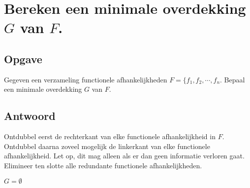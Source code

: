 \documentclass[normaalvormen.tex]{subfiles}
\begin{document}
\section{Bereken een minimale overdekking $G$ van $F$.}
\subsection{Opgave}
Gegeven een verzameling functionele afhankelijkheden $F= \{f_1,f_2,\cdots,f_n$. Bepaal een minimale overdekking $G$ van $F$.
\subsection{Antwoord}
Ontdubbel eerst de rechterkant van elke functionele afhankelijkheid in $F$. Ontdubbel daarna zoveel mogelijk de linkerkant van elke functionele afhankelijkheid. Let op, dit mag alleen als er dan geen informatie verloren gaat. Elimineer ten slotte alle redundante functionele afhankelijkheden.

\begin{mdframed}
\begin{algorithm}[H]
$G = \emptyset$\\

\end{algorithm}
\end{mdframed}
\end{document}
